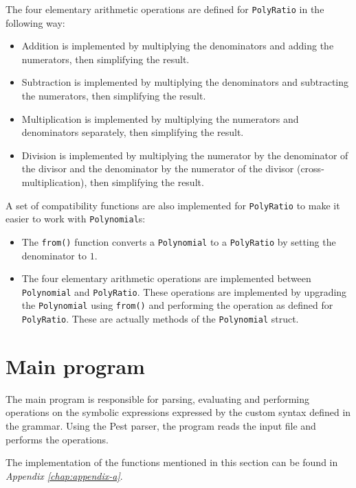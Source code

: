 The four elementary arithmetic operations are defined for \verb|PolyRatio| in the following way:
\begin{itemize}
    \item Addition is implemented by multiplying the denominators and adding the numerators, then simplifying the result.
    \item Subtraction is implemented by multiplying the denominators and subtracting the numerators, then simplifying the result.
    \item Multiplication is implemented by multiplying the numerators and denominators separately, then simplifying the result.
    \item Division is implemented by multiplying the numerator by the denominator of the divisor and the denominator by the numerator of the divisor (cross-multiplication), then simplifying the result. 
\end{itemize}



A set of compatibility functions are also implemented for \verb|PolyRatio| to make it easier to work with \verb|Polynomial|s:

\begin{itemize}
    \item The \verb|from()| function converts a \verb|Polynomial| to a \verb|PolyRatio| by setting the denominator to $1$.
    \item The four elementary arithmetic operations are implemented between \verb|Polynomial| and \verb|PolyRatio|. These operations are implemented by upgrading the \verb|Polynomial| using \verb|from()| and performing the operation as defined for \verb|PolyRatio|. These are actually methods of the \verb|Polynomial| struct.
\end{itemize}



\section{Main program}\label{sec:main-program}

The main program is responsible for parsing, evaluating and performing operations on the symbolic expressions expressed by the custom syntax defined in the grammar. Using the Pest parser, the program reads the input file and performs the operations.

The implementation of the functions mentioned in this section can be found in \textit{Appendix \ref{chap:appendix-a}}.

